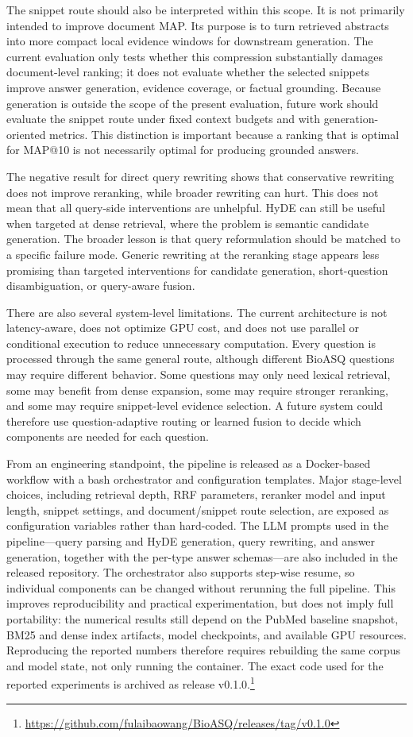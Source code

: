 \documentclass[
]{ceurart}
\begin{document}
The snippet route should also be interpreted within this scope. It is not primarily intended to improve document MAP. Its purpose is to turn retrieved abstracts into more compact local evidence windows for downstream generation. The current evaluation only tests whether this compression substantially damages document-level ranking; it does not evaluate whether the selected snippets improve answer generation, evidence coverage, or factual grounding. Because generation is outside the scope of the present evaluation, future work should evaluate the snippet route under fixed context budgets and with generation-oriented metrics. This distinction is important because a ranking that is optimal for MAP@10 is not necessarily optimal for producing grounded answers.

The negative result for direct query rewriting shows that conservative rewriting does not improve reranking, while broader rewriting can hurt. This does not mean that all query-side interventions are unhelpful. HyDE can still be useful when targeted at dense retrieval, where the problem is semantic candidate generation. The broader lesson is that query reformulation should be matched to a specific failure mode. Generic rewriting at the reranking stage appears less promising than targeted interventions for candidate generation, short-question disambiguation, or query-aware fusion.

There are also several system-level limitations. The current architecture is not latency-aware, does not optimize GPU cost, and does not use parallel or conditional execution to reduce unnecessary computation. Every question is processed through the same general route, although different BioASQ questions may require different behavior. Some questions may only need lexical retrieval, some may benefit from dense expansion, some may require stronger reranking, and some may require snippet-level evidence selection. A future system could therefore use question-adaptive routing or learned fusion to decide which components are needed for each question.

From an engineering standpoint, the pipeline is released as a Docker-based workflow with a bash orchestrator and configuration templates. Major stage-level choices, including retrieval depth, RRF parameters, reranker model and input length, snippet settings, and document/snippet route selection, are exposed as configuration variables rather than hard-coded. The LLM prompts used in the pipeline---query parsing and HyDE generation, query rewriting, and answer generation, together with the per-type answer schemas---are also included in the released repository. The orchestrator also supports step-wise resume, so individual components can be changed without rerunning the full pipeline. This improves reproducibility and practical experimentation, but does not imply full portability: the numerical results still depend on the PubMed baseline snapshot, BM25 and dense index artifacts, model checkpoints, and available GPU resources. Reproducing the reported numbers therefore requires rebuilding the same corpus and model state, not only running the container. The exact code used for the reported experiments is archived as release v0.1.0.\footnote{\url{https://github.com/fulaibaowang/BioASQ/releases/tag/v0.1.0}}
\end{document}
